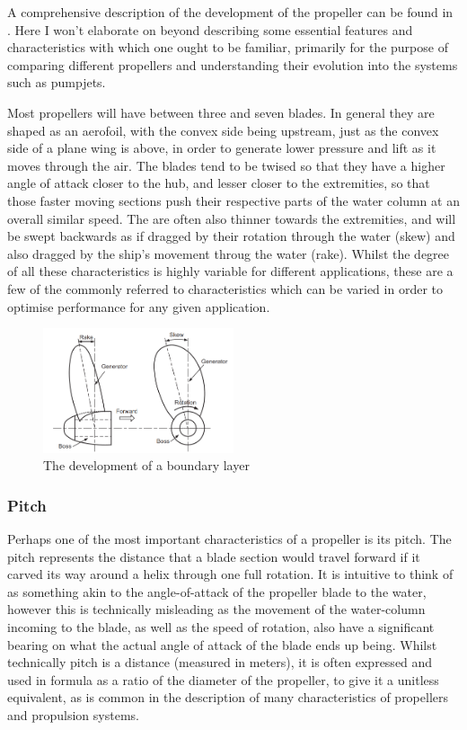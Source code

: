 \documentclass{article}\usepackage[]{graphicx}\usepackage[]{color}
\begin{document}
A comprehensive description of the development of the propeller can be found in \cite{carlton2007}.  Here I won't elaborate on beyond describing some essential features and characteristics with which one ought to be familiar, primarily for the purpose of comparing different propellers and understanding their evolution into the systems such as pumpjets.

Most propellers will have between three and seven blades.  In general they are shaped as an aerofoil, with the convex side being upstream, just as the convex side of a plane wing is above, in order to generate lower pressure and lift as it moves through the air.  The blades tend to be twised so that they have a higher angle of attack closer to the hub, and lesser closer to the extremities, so that those faster moving sections push their respective parts of the water column at an overall similar speed.  The are often also thinner towards the extremities, and will be swept backwards as if dragged by their rotation through the water (skew) and also dragged by the ship's movement throug the water (rake). Whilst the degree of all these characteristics is highly variable for different applications, these are a few of the commonly referred to characteristics which can be varied in order to optimise performance for any given application.

\begin{figure}[h]
\captionsetup{width=0.5\textwidth}
\includegraphics[width=0.5\textwidth, center]{SkewRake.png}
\caption{The development of a boundary layer \parencite[262]{mollard2011}}
\label{fig:SkewRake.png}
\end{figure}

\subsubsection{Pitch}
Perhaps one of the most important characteristics of a propeller is its pitch.  The pitch represents the distance that a blade section would travel forward if it carved its way around a helix through one full rotation.  It is intuitive to think of as something akin to the angle-of-attack of the propeller blade to the water, however this is technically misleading as the movement of the water-column incoming to the blade, as well as the speed of rotation, also have a significant bearing on what the actual angle of attack of the blade ends up being.  Whilst technically pitch is a distance (measured in meters), it is often expressed and used in formula as a ratio of the diameter of the propeller, to give it a unitless equivalent, as is common in the description of many characteristics of propellers and propulsion systems.
\end{document}
